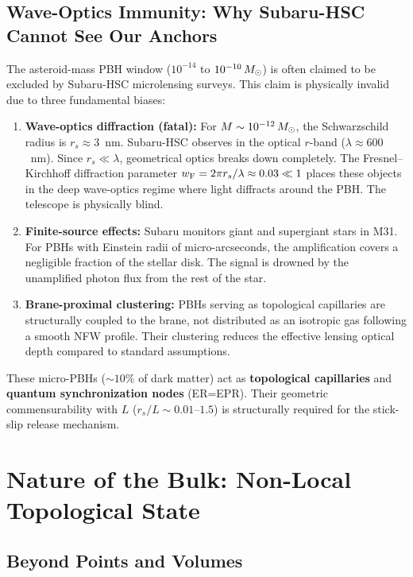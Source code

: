 \subsection{Wave-Optics Immunity: Why Subaru-HSC Cannot See Our Anchors}

The asteroid-mass PBH window ($10^{-14}$ to $10^{-10}\,M_\odot$) is often claimed to be excluded by Subaru-HSC microlensing surveys. This claim is physically invalid due to three fundamental biases:

\begin{enumerate}
  \item \textbf{Wave-optics diffraction (fatal):} For $M \sim 10^{-12}\,M_\odot$, the Schwarzschild radius is $r_s \approx 3$~nm. Subaru-HSC observes in the optical $r$-band ($\lambda \approx 600$~nm). Since $r_s \ll \lambda$, geometrical optics breaks down completely. The Fresnel--Kirchhoff diffraction parameter $w_\text{F} = 2\pi r_s/\lambda \approx 0.03 \ll 1$ places these objects in the deep wave-optics regime where light diffracts around the PBH. The telescope is physically blind.

  \item \textbf{Finite-source effects:} Subaru monitors giant and supergiant stars in M31. For PBHs with Einstein radii of micro-arcseconds, the amplification covers a negligible fraction of the stellar disk. The signal is drowned by the unamplified photon flux from the rest of the star.

  \item \textbf{Brane-proximal clustering:} PBHs serving as topological capillaries are structurally coupled to the brane, not distributed as an isotropic gas following a smooth NFW profile. Their clustering reduces the effective lensing optical depth compared to standard assumptions.
\end{enumerate}

These micro-PBHs ($\sim 10\%$ of dark matter) act as \textbf{topological capillaries} and \textbf{quantum synchronization nodes} (ER=EPR). Their geometric commensurability with $L$ ($r_s/L \sim 0.01$--$1.5$) is structurally required for the stick-slip release mechanism.

\section{Nature of the Bulk: Non-Local Topological State}
\label{sec:bulk}

\subsection{Beyond Points and Volumes}

